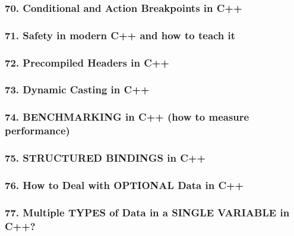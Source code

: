 \documentclass[11pt]{article}
\begin{document}
\hypertarget{conditional-and-action-breakpoints-in-c}{%
\subsubsection{70. Conditional and Action Breakpoints in
C++}\label{conditional-and-action-breakpoints-in-c}}

\hypertarget{safety-in-modern-c-and-how-to-teach-it}{%
\subsubsection{71. Safety in modern C++ and how to teach
it}\label{safety-in-modern-c-and-how-to-teach-it}}

\hypertarget{precompiled-headers-in-c}{%
\subsubsection{72. Precompiled Headers in
C++}\label{precompiled-headers-in-c}}

\hypertarget{dynamic-casting-in-c}{%
\subsubsection{73. Dynamic Casting in C++}\label{dynamic-casting-in-c}}

\hypertarget{benchmarking-in-c-how-to-measure-performance}{%
\subsubsection{74. BENCHMARKING in C++ (how to measure
performance)}\label{benchmarking-in-c-how-to-measure-performance}}

\hypertarget{structured-bindings-in-c}{%
\subsubsection{75. STRUCTURED BINDINGS in
C++}\label{structured-bindings-in-c}}

\hypertarget{how-to-deal-with-optional-data-in-c}{%
\subsubsection{76. How to Deal with OPTIONAL Data in
C++}\label{how-to-deal-with-optional-data-in-c}}

\hypertarget{multiple-types-of-data-in-a-single-variable-in-c}{%
\subsubsection{77. Multiple TYPES of Data in a SINGLE VARIABLE in
C++?}\label{multiple-types-of-data-in-a-single-variable-in-c}}
\end{document}
